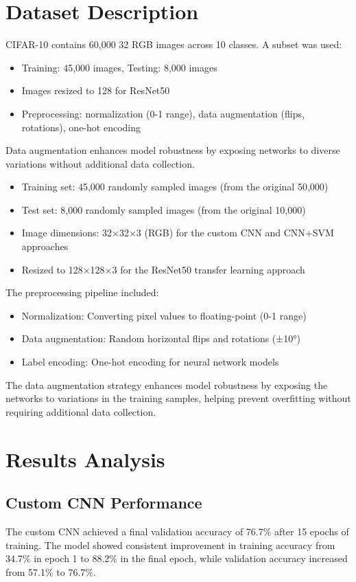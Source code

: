 \documentclass[12pt]{article}
\begin{document}
\section{Dataset Description}
CIFAR-10 contains 60,000 32 RGB images across 10 classes. A subset was used:
\begin{itemize}
    \item Training: 45,000 images, Testing: 8,000 images
    \item Images resized to 128 for ResNet50
    \item Preprocessing: normalization (0-1 range), data augmentation (flips, rotations), one-hot encoding
\end{itemize}
Data augmentation enhances model robustness by exposing networks to diverse variations without additional data collection.

\begin{itemize}
    \item Training set: 45,000 randomly sampled images (from the original 50,000)
    \item Test set: 8,000 randomly sampled images (from the original 10,000)
    \item Image dimensions: 32×32×3 (RGB) for the custom CNN and CNN+SVM approaches
    \item Resized to 128×128×3 for the ResNet50 transfer learning approach
\end{itemize}

The preprocessing pipeline included:
\begin{itemize}
    \item Normalization: Converting pixel values to floating-point (0-1 range)
    \item Data augmentation: Random horizontal flips and rotations (±10°)
    \item Label encoding: One-hot encoding for neural network models
\end{itemize}

The data augmentation strategy enhances model robustness by exposing the networks to variations in the training samples, helping prevent overfitting without requiring additional data collection.

\section{Results Analysis}
\subsection{Custom CNN Performance}
The custom CNN achieved a final validation accuracy of 76.7\% after 15 epochs of training. The model showed consistent improvement in training accuracy from 34.7\% in epoch 1 to 88.2\% in the final epoch, while validation accuracy increased from 57.1\% to 76.7\%.
\end{document}
